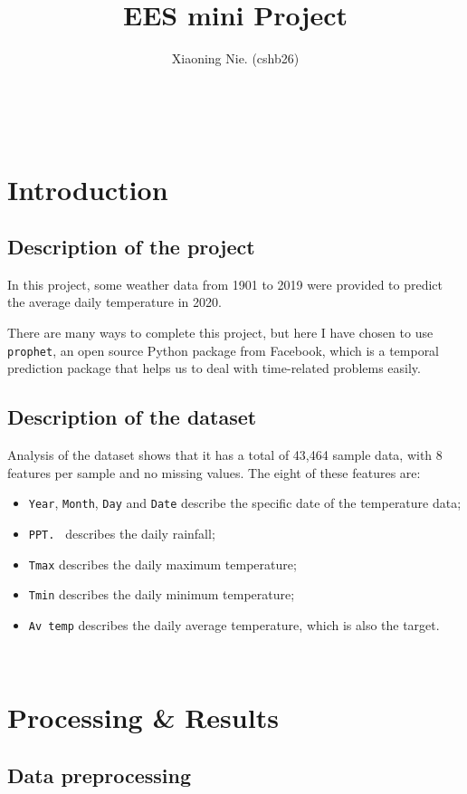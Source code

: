 \documentclass{article}
\title{EES mini Project}
\author{Xiaoning Nie. (cshb26)}
\begin{document}
\maketitle

\ 

\section{Introduction}

\subsection{Description of the project}

In this project, some weather data from 1901 to 2019 were provided to predict the average daily temperature in 2020.

There are many ways to complete this project, but here I have chosen to use \verb|prophet|, an open source Python package from Facebook, which is a temporal prediction package that helps us to deal with time-related problems easily.


\subsection{Description of the dataset}

Analysis of the dataset shows that it has a total of 43,464 sample data, with 8 features per sample and no missing values. The eight of these features are:

\begin{itemize}
\item \verb|Year|, \verb|Month|, \verb|Day| and \verb|Date| describe the specific date of the temperature data;
\item \verb|PPT. | describes the daily rainfall;
\item \verb|Tmax| describes the daily maximum temperature;
\item \verb|Tmin| describes the daily minimum temperature;
\item \verb|Av temp| describes the daily average temperature, which is also the target.
\end{itemize}

\ 

\section{Processing \& Results}

\subsection{Data preprocessing}
\end{document}
